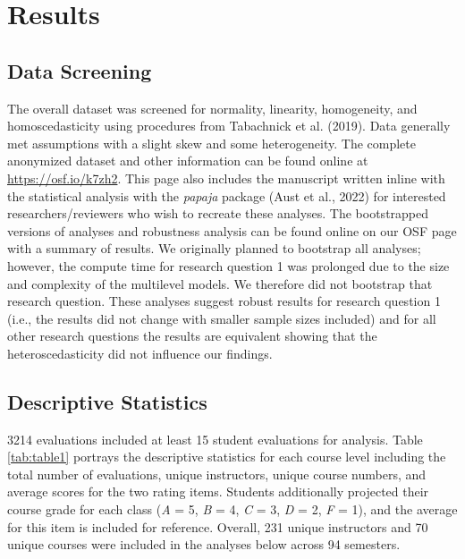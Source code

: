 \documentclass[
  man]{apa7}
\begin{document}
\section{Results}\label{results}

\subsection{Data Screening}\label{data-screening}

The overall dataset was screened for normality, linearity, homogeneity,
and homoscedasticity using procedures from Tabachnick et al. (2019). Data
generally met assumptions with a slight skew and some heterogeneity. The
complete anonymized dataset and other information can be found online at
\url{https://osf.io/k7zh2}. This page also includes the manuscript written
inline with the statistical analysis with the \emph{papaja} package
(Aust et al., 2022) for interested researchers/reviewers who wish to recreate
these analyses. The bootstrapped versions of analyses and robustness
analysis can be found online on our OSF page with a summary of results.
We originally planned to bootstrap all analyses; however, the compute
time for research question 1 was prolonged due to the size and
complexity of the multilevel models. We therefore did not bootstrap that
research question. These analyses suggest robust results for research
question 1 (i.e., the results did not change with smaller sample sizes
included) and for all other research questions the results are
equivalent showing that the heteroscedasticity did not influence our
findings.

\subsection{Descriptive Statistics}\label{descriptive-statistics}

3214 evaluations included at least 15 student evaluations
for analysis. Table \ref{tab:table1} portrays the descriptive
statistics for each course level including the total number of
evaluations, unique instructors, unique course numbers, and average
scores for the two rating items. Students additionally projected their
course grade for each class (\emph{A} = 5, \emph{B} = 4, \emph{C} = 3, \emph{D} = 2, \emph{F} =
1), and the average for this item is included for reference. Overall,
231 unique instructors and
70 unique courses were included in
the analyses below across 94
semesters.
\end{document}
